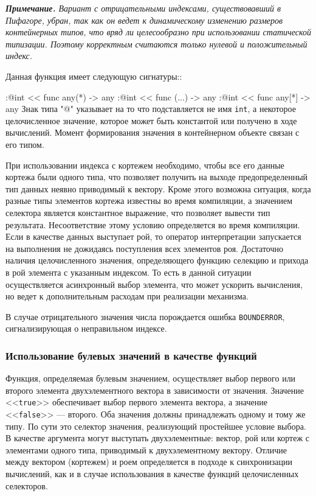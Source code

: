 \textit{\textbf{Примечание.}
Вариант с отрицательными индексами, существовавший в Пифагоре, убран, так как он ведет к динамическому изменению размеров контейнерных типов, что вряд ли целесообразно при использовании статической типизации. Поэтому корректным считаются только  нулевой и положительный индекс.}

Данная функция имеет следующую сигнатуры::

:@int << func any(*) -> any
:@int << func (...) -> any
:@int << func any[*] -> any
Знак типа "@" указывает на то что подставляется не имя  \verb|int|, а некоторое целочисленное значение, которое может быть константой или получено в ходе вычислений. Момент формирования значения в контейнерном объекте связан с его типом.

При использовании индекса с кортежем необходимо, чтобы все его данные кортежа были одного типа, что позволяет получить на выходе предопределенный тип данных неявно приводимый к вектору. Кроме этого возможна ситуация, когда разные типы элементов кортежа известны во время компиляции, а значением селектора является константное выражение, что позволяет вывести тип результата. Несоответствие этому условию определяется во время компиляции. Если в качестве данных выступает рой, то оператор интерпретации запускается на выполнения не дожидаясь поступления всех элементов роя. Достаточно наличия целочисленного значения, определяющего функцию селекцию и прихода в рой элемента с указанным индексом. То есть в данной ситуации осуществляется асинхронный выбор элемента, что может ускорить вычисления, но ведет к дополнительным расходам при реализации механизма.

В случае отрицательного значения числа порождается ошибка \verb|BOUNDERROR|, сигнализирующая о неправильном индексе.

\subsubsection{Использование булевых значений в качестве функций}

Функция, определяемая булевым значением, осуществляет выбор первого или второго элемента двухэлементного вектора в зависимости от значения. Значение <<\verb|true|>> обеспечивает выбор первого элемента вектора, а значение <<\verb|false|>> --- второго. Оба значения должны принадлежать одному и тому же типу. По сути это селектор значения, реализующий простейшее условие выбора. В качестве аргумента могут выступать двухэлементные: вектор, рой или кортеж с элементами одного типа, приводимый к двухэлементному вектору. Отличие между вектором (кортежем) и роем определяется в подходе к синхронизации вычислений, как и в случае использования в качестве функций целочисленных селекторов.

